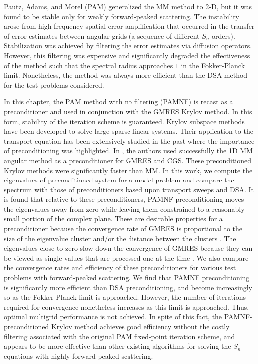 Pautz, Adams, and Morel (PAM) \cite{multigrid_2d} generalized the MM method to
2-D, but it was found to be stable only for weakly forward-peaked scattering.
The instability arose from high-frequency spatial error amplification that
occurred in the transfer of error estimates between angular grids (a sequence
of different $S_n$ orders). Stabilization was achieved by filtering the error
estimates via diffusion operators. However, this filtering was expensive and
significantly degraded the effectiveness of the method such that the spectral
radius approaches $1$ in the Fokker-Planck limit.  Nonetheless, the method was 
always more efficient than the DSA method for the test problems considered.

In this chapter, the PAM method with no filtering (PAMNF) is recast as a 
preconditioner and used in conjunction with the GMRES Krylov method. In this form, 
stability of the iteration scheme is guaranteed. Krylov subspace methods have been 
developed to solve large sparse linear systems. Their application to the transport 
equation has been extensively studied in the past \cite{faber,oliveira,patton,warsa} 
where the importance of preconditioning was highlighted. In \cite{oliveira}, the 
authors used successfully the 1D MM angular method as a preconditioner for GMRES and 
CGS. These preconditioned Krylov methods were significantly faster than MM. In this 
work, we compute the eigenvalues of preconditioned system for a model problem and 
compare the spectrum with those of preconditioners based upon transport sweeps and 
DSA. It is found that relative to these preconditioners, PAMNF preconditioning moves 
the eigenvalues away from zero while leaving them constrained to a reasonably small 
portion of the complex plane. These are desirable properties for a preconditioner 
because the convergence rate of GMRES is proportional to the size of the eigenvalue 
cluster and/or the distance between the clusters \cite{warsa,campbell}. The 
eigenvalues close to zero slow down the convergence of GMRES because they can be 
viewed as single values that are processed one at the time \cite{warsa,campbell}.
We also compare the convergence rates and efficiency of these preconditioners for 
various test problems with forward-peaked scattering. We find that PAMNF 
preconditioning is significantly more efficient than DSA preconditioning, and 
become increasingly so as the Fokker-Planck limit is approached. However, the 
number of iterations required for convergence nonetheless increases as this limit 
is approached. Thus, optimal multigrid performance is not achieved. In spite of 
this fact, the PAMNF-preconditioned Krylov method achieves good efficiency without 
the costly filtering associated with the original PAM fixed-point iteration scheme, 
and appears to be more effective than other existing algorithms for solving the 
$S_n$ equations with highly forward-peaked scattering.

